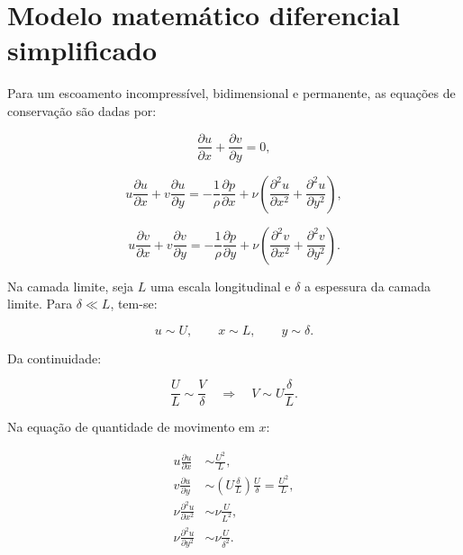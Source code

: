 \documentclass[12pt,a4paper]{article}
\begin{document}
\section{Modelo matemático diferencial simplificado}

Para um escoamento incompressível, bidimensional e permanente, as equações de conservação são dadas por:

\begin{equation}
    \frac{\partial u}{\partial x} + \frac{\partial v}{\partial y} = 0,
\end{equation}

\begin{equation}
    u\frac{\partial u}{\partial x} + v\frac{\partial u}{\partial y}
    = -\frac{1}{\rho}\frac{\partial p}{\partial x}
    + \nu\left(\frac{\partial^2 u}{\partial x^2}+\frac{\partial^2 u}{\partial y^2}\right),
\end{equation}

\begin{equation}
    u\frac{\partial v}{\partial x} + v\frac{\partial v}{\partial y}
    = -\frac{1}{\rho}\frac{\partial p}{\partial y}
    + \nu\left(\frac{\partial^2 v}{\partial x^2}+\frac{\partial^2 v}{\partial y^2}\right).
\end{equation}

Na camada limite, seja $L$ uma escala longitudinal e $\delta$ a espessura da camada limite. Para $\delta \ll L$, tem-se:

\begin{equation}
    u \sim U, \qquad x \sim L, \qquad y \sim \delta.
\end{equation}

Da continuidade:

\begin{equation}
    \frac{U}{L} \sim \frac{V}{\delta}
    \quad \Rightarrow \quad
    V \sim U\frac{\delta}{L}.
\end{equation}

Na equação de quantidade de movimento em $x$:

\begin{align}
    u\frac{\partial u}{\partial x} &\sim \frac{U^2}{L}, \\
    v\frac{\partial u}{\partial y} &\sim \left(U\frac{\delta}{L}\right)\frac{U}{\delta}=\frac{U^2}{L}, \\
    \nu\frac{\partial^2 u}{\partial x^2} &\sim \nu\frac{U}{L^2}, \\
    \nu\frac{\partial^2 u}{\partial y^2} &\sim \nu\frac{U}{\delta^2}.
\end{align}
\end{document}
